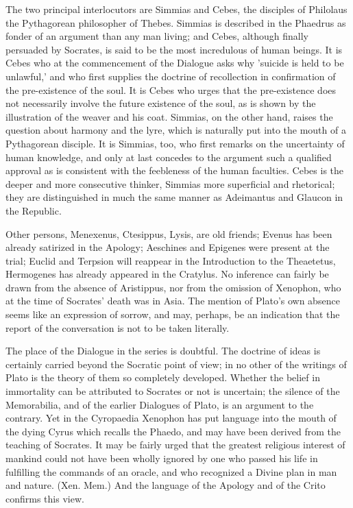 The two principal interlocutors are Simmias and Cebes, the disciples of
Philolaus the Pythagorean philosopher of Thebes. Simmias is described in
the Phaedrus as fonder of an argument than any man living; and Cebes,
although finally persuaded by Socrates, is said to be the most incredulous
of human beings. It is Cebes who at the commencement of the Dialogue asks
why 'suicide is held to be unlawful,' and who first supplies the doctrine
of recollection in confirmation of the pre-existence of the soul. It is
Cebes who urges that the pre-existence does not necessarily involve the
future existence of the soul, as is shown by the illustration of the
weaver and his coat. Simmias, on the other hand, raises the question about
harmony and the lyre, which is naturally put into the mouth of a
Pythagorean disciple. It is Simmias, too, who first remarks on the
uncertainty of human knowledge, and only at last concedes to the argument
such a qualified approval as is consistent with the feebleness of the
human faculties. Cebes is the deeper and more consecutive thinker, Simmias
more superficial and rhetorical; they are distinguished in much the same
manner as Adeimantus and Glaucon in the Republic.

Other persons, Menexenus, Ctesippus, Lysis, are old friends; Evenus has
been already satirized in the Apology; Aeschines and Epigenes were present
at the trial; Euclid and Terpsion will reappear in the Introduction to the
Theaetetus, Hermogenes has already appeared in the Cratylus. No inference
can fairly be drawn from the absence of Aristippus, nor from the omission
of Xenophon, who at the time of Socrates' death was in Asia. The mention
of Plato's own absence seems like an expression of sorrow, and may,
perhaps, be an indication that the report of the conversation is not to be
taken literally.

The place of the Dialogue in the series is doubtful. The doctrine of ideas
is certainly carried beyond the Socratic point of view; in no other of the
writings of Plato is the theory of them so completely developed. Whether
the belief in immortality can be attributed to Socrates or not is
uncertain; the silence of the Memorabilia, and of the earlier Dialogues of
Plato, is an argument to the contrary. Yet in the Cyropaedia Xenophon has
put language into the mouth of the dying Cyrus which recalls the Phaedo,
and may have been derived from the teaching of Socrates. It may be fairly
urged that the greatest religious interest of mankind could not have been
wholly ignored by one who passed his life in fulfilling the commands of an
oracle, and who recognized a Divine plan in man and nature. (Xen. Mem.)
And the language of the Apology and of the Crito confirms this view.

